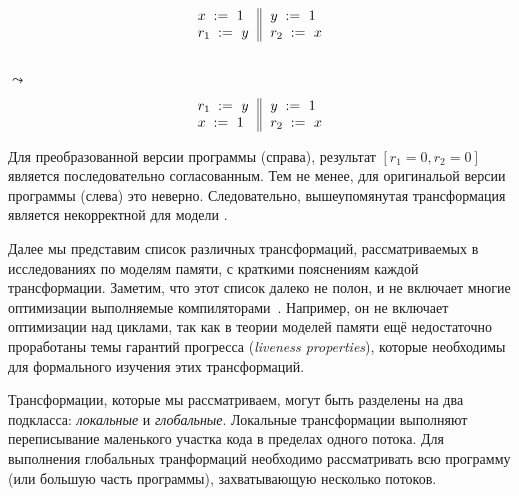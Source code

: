 \begin{minipage}{0.45\linewidth}
\begin{equation*}
\inarrII{
   \writeInst{}{x}{1}   \\
   \readInst{}{r_1}{y}  \\
}{
  \writeInst{}{y}{1}   \\
  \readInst{}{r_2}{x}  \\
}
\end{equation*}
\end{minipage}\hfill%
\begin{minipage}{0.05\linewidth}
\Large~\\ $\leadsto$
\end{minipage}\hfill%
\begin{minipage}{0.45\linewidth}
\begin{equation*}
\inarrII{
   \readInst{}{r_1}{y}  \\
   \writeInst{}{x}{1}   \\
}{
  \writeInst{}{y}{1}   \\
  \readInst{}{r_2}{x}  \\
}
\end{equation*}
\end{minipage}

Для преобразованной версии программы (справа),
результат $[r_1=0, r_2=0]$ является последовательно согласованным. 
Тем не менее, для оригинальой версии программы (слева) это неверно. 
Следовательно, вышеупомянутая трансформация 
является некорректной для модели \SC. 

Далее мы представим список различных трансформаций,
рассматриваемых в исследованиях по моделям памяти, 
с краткими пояснениям каждой трансформации. 
Заметим, что этот список далеко не полон, 
и не включает многие оптимизации 
выполняемые компиляторами~\cite{Muchnick:ACDI97}.
Например, он не включает оптимизации над циклами,
так как в теории моделей памяти ещё недостаточно 
проработаны темы гарантий прогресса 
(\emph{liveness properties}), 
которые необходимы для формального 
изучения этих трансформаций. 

Трансформации, которые мы рассматриваем, могут быть 
разделены на два подкласса: \emph{локальные} и \emph{глобальные}.
Локальные трансформации выполняют переписывание 
маленького участка кода в пределах одного потока. 
Для выполнения глобальных транформаций 
необходимо рассматривать всю программу 
(или большую часть программы), 
захватывающую несколько потоков.      
 
